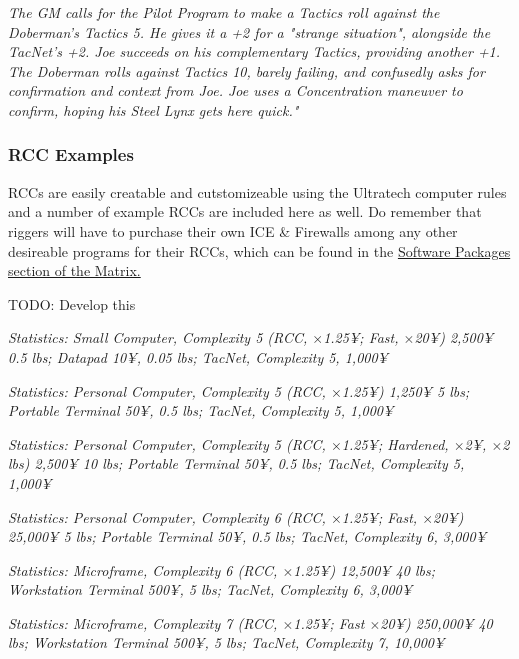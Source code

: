 \begin{multicols*}{3}
	\textcolor{OliveGreen}{\textit{The GM calls for the Pilot Program to make a Tactics roll against the Doberman's Tactics 5. He gives it a +2 for a "strange situation", alongside the TacNet's +2. Joe succeeds on his complementary Tactics, providing another +1. The Doberman rolls against Tactics 10, barely failing, and confusedly asks for confirmation and context from Joe. Joe uses a Concentration maneuver to confirm, hoping his Steel Lynx gets here quick."}}
	
	\subsubsection{RCC Examples}
	
	RCCs are easily creatable and cutstomizeable using the Ultratech computer rules and a number of example RCCs are included here as well. Do remember that riggers will have to purchase their own ICE \& Firewalls among any other desireable programs for their RCCs, which can be found in the \hyperref[software_packages]{Software Packages section of the Matrix.}
	
	TODO: Develop this
	
	\textcolor{OliveGreen}{\textit{Statistics: Small Computer, Complexity 5 (RCC, \(\times\)1.25¥; Fast, \(\times\)20¥) 2,500¥ 0.5 lbs; Datapad 10¥, 0.05 lbs; TacNet, Complexity 5, 1,000¥}}
	
	\textcolor{OliveGreen}{\textit{Statistics: Personal Computer, Complexity 5 (RCC, \(\times\)1.25¥) 1,250¥ 5 lbs; Portable Terminal 50¥, 0.5 lbs; TacNet, Complexity 5, 1,000¥}}
	
	\textcolor{OliveGreen}{\textit{Statistics: Personal Computer, Complexity 5 (RCC, \(\times\)1.25¥; Hardened, \(\times\)2¥, \(\times\)2 lbs) 2,500¥ 10 lbs; Portable Terminal 50¥, 0.5 lbs; TacNet, Complexity 5, 1,000¥}}
	
	\textcolor{OliveGreen}{\textit{Statistics: Personal Computer, Complexity 6 (RCC, \(\times\)1.25¥; Fast, \(\times\)20¥) 25,000¥ 5 lbs; Portable Terminal 50¥, 0.5 lbs; TacNet, Complexity 6, 3,000¥}}
	
	\textcolor{OliveGreen}{\textit{Statistics: Microframe, Complexity 6 (RCC, \(\times\)1.25¥) 12,500¥ 40 lbs; Workstation Terminal 500¥, 5 lbs; TacNet, Complexity 6, 3,000¥}}
	
	\textcolor{OliveGreen}{\textit{Statistics: Microframe, Complexity 7 (RCC, \(\times\)1.25¥; Fast \(\times\)20¥) 250,000¥ 40 lbs; Workstation Terminal 500¥, 5 lbs; TacNet, Complexity 7, 10,000¥}}
	
\end{multicols*}